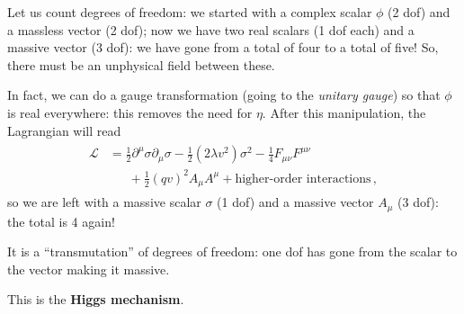 \documentclass[main.tex]{subfiles}
\begin{document}
Let us count degrees of freedom: we started with a complex scalar \(\phi \) (2 dof) and a massless vector (2 dof); now we have two real scalars (1 dof each) and a massive vector (3 dof): we have gone from a total of four to a total of five! 
So, there must be an unphysical field between these. 

In fact, we can do a gauge transformation (going to the \emph{unitary gauge}) so that \(\phi \) is real everywhere: this removes the need for \(\eta \). 
After this manipulation, the Lagrangian will read 
%
\begin{align}
\begin{split}
\mathscr{L} &= \frac{1}{2} \partial^{\mu } \sigma \partial_{\mu } \sigma 
- \frac{1}{2} (2 \lambda v^2) \sigma^2 
- \frac{1}{4} F_{\mu \nu } F^{\mu \nu } \\
&\phantom{=}\ 
+ \frac{1}{2} (qv)^2 A_{\mu} A^{\mu }  
+ \text{higher-order interactions}
\,,
\end{split}
\end{align}
%
so we are left with a massive scalar \(\sigma \) (1 dof) and a massive vector \(A_{\mu } \) (3 dof): the total is 4 again! 

It is a ``transmutation'' of degrees of freedom: one dof has gone from the scalar to the vector making it massive. 

This is the \textbf{Higgs mechanism}.

\end{document}
